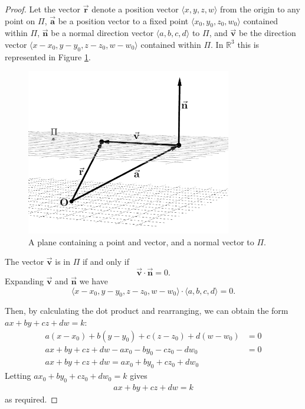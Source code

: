 \begin{proof}
    Let the vector $\Vec{\mathbf{r}}$ denote a position vector $\langle x, y, z, w\rangle$ from the origin to any point on $\Pi$, $\Vec{\mathbf{a}}$ be a position vector to a fixed point $\langle x_0, y_0, z_0, w_0\rangle$ contained within $\Pi$, $\Vec{\mathbf{n}}$ be a normal direction vector $\langle a, b, c, d\rangle$ to $\Pi$, and $\Vec{\mathbf{v}}$ be the direction vector $\langle x-x_0, y-y_0, z-z_0, w-w_0\rangle$ contained within $\Pi$. In $\mathbb{R}^3$ this is represented in Figure \ref{fig:plane equation proof setup}.
    \begin{figure}[H]
        \centering
        \includegraphics[width=0.8\textwidth]{images/vector equation of plane.png}
        \caption{A plane containing a point and vector, and a normal vector to $\Pi$.}
        \label{fig:plane equation proof setup}
    \end{figure}
    
    \noindent
    The vector $\Vec{\mathbf{v}}$ is in $\Pi$ if and only if $$\Vec{\mathbf{v}} \cdot \Vec{\mathbf{n}} = 0.$$ Expanding $\Vec{\mathbf{v}}$ and $\Vec{\mathbf{n}}$ we have $$\langle x-x_0, y-y_0, z-z_0, w-w_0\rangle \cdot \langle a, b, c, d\rangle = 0.$$
    
    \noindent
    Then, by calculating the dot product and rearranging, we can obtain the form $ax+by+cz+dw=k$:
    \begin{align*}
        a(x-x_0)+b(y-y_0)+c(z-z_0)+d(w-w_0) &= 0\\
        ax+by+cz+dw-ax_0-by_0-cz_0-dw_0 &= 0\\
        ax+by+cz+dw = ax_0+by_0+cz_0+dw_0
    \end{align*}
    Letting $ax_0+by_0+cz_0+dw_0=k$ gives
    \begin{align*}
        ax+by+cz+dw = k
    \end{align*}
    as required.
\end{proof}

